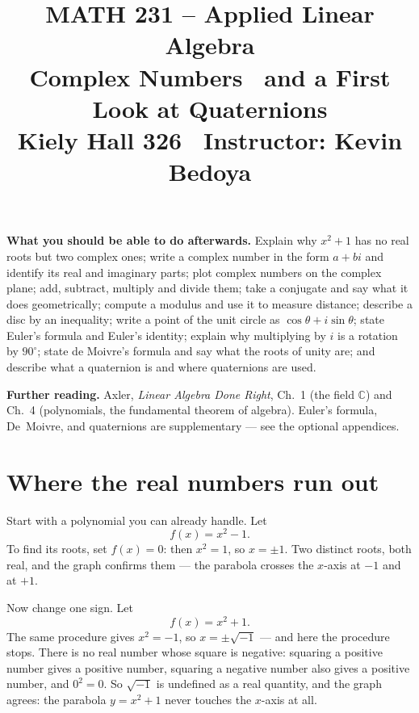 \documentclass[11pt]{article}
\title{\vspace{-1.2cm}\textbf{\sffamily MATH 231 -- Applied Linear Algebra}\\[4pt]
       {\large\sffamily Complex Numbers \textbullet\ and a First Look at
        Quaternions}\\[2pt]
       {\normalsize\sffamily Kiely Hall 326 \textbullet\
        Instructor: Kevin Bedoya}}
\author{}
\date{}
\theoremstyle{definition}
\theoremstyle{remark}
\newcommand{\C}{\mathbb{C}}
\begin{document}
\maketitle
\vspace{-1.6cm}

\noindent\textbf{What you should be able to do afterwards.} Explain why
$x^{2}+1$ has no real roots but two complex ones; write a complex number in the
form $a+bi$ and identify its real and imaginary parts; plot complex numbers on
the complex plane; add, subtract, multiply and divide them; take a conjugate and
say what it does geometrically; compute a modulus and use it to measure
distance; describe a disc by an inequality; write a point of the unit circle as
$\cos\theta+i\sin\theta$; state Euler's formula and Euler's identity; explain
why multiplying by $i$ is a rotation by $90^{\circ}$; state de Moivre's formula
and say what the roots of unity are; and describe what a quaternion is and where
quaternions are used.

\medskip
\noindent\textbf{Further reading.}
Axler, \emph{Linear Algebra Done Right}, Ch.~1 (the field $\C$) and Ch.~4
(polynomials, the fundamental theorem of algebra). Euler's formula, De~Moivre,
and quaternions are supplementary --- see the optional appendices.

\section{Where the real numbers run out}
Start with a polynomial you can already handle. Let
\[
  f(x)=x^{2}-1 .
\]
To find its roots, set $f(x)=0$: then $x^{2}=1$, so $x=\pm 1$. Two distinct
roots, both real, and the graph confirms them --- the parabola crosses the
$x$-axis at $-1$ and at $+1$.

Now change one sign. Let
\[
  f(x)=x^{2}+1 .
\]
The same procedure gives $x^{2}=-1$, so $x=\pm\sqrt{-1}$ --- and here the
procedure stops. There is no real number whose square is negative: squaring a
positive number gives a positive number, squaring a negative number also gives a
positive number, and $0^{2}=0$. So $\sqrt{-1}$ is undefined as a real quantity,
and the graph agrees: the parabola $y=x^{2}+1$ never touches the $x$-axis at
all.
\end{document}
